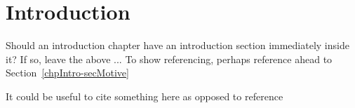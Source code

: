 \section{Introduction}
\label{chpIntro-secIntro}

Should an introduction chapter have an introduction section immediately inside it? If so, leave the above ...
To show referencing, perhaps reference ahead to Section~\ref{chpIntro-secMotive}

It could be useful to cite something here as opposed to reference\cite{JackKurzweil2000}

